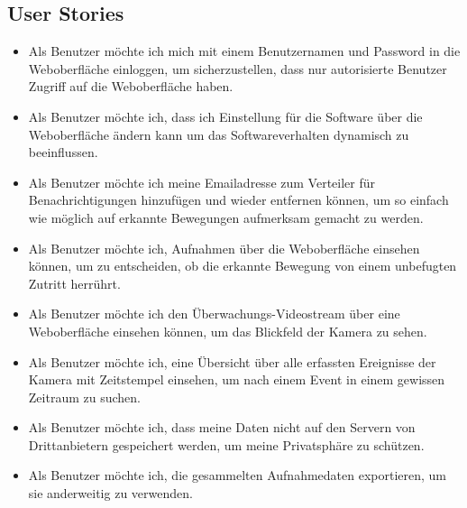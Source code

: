 \subsection{User Stories}
\begin{itemize}
\item
Als Benutzer möchte ich mich mit einem Benutzernamen und Password in die Weboberfläche einloggen, um sicherzustellen, dass nur autorisierte Benutzer Zugriff auf die Weboberfläche haben.
\item
Als Benutzer möchte ich, dass ich Einstellung für die Software über die Weboberfläche ändern kann um das Softwareverhalten dynamisch zu beeinflussen.
\item
Als Benutzer möchte ich meine Emailadresse zum Verteiler für Benachrichtigungen hinzufügen und wieder entfernen können, um so einfach wie möglich auf erkannte Bewegungen aufmerksam gemacht zu werden.
\item
Als Benutzer möchte ich, Aufnahmen über die Weboberfläche einsehen können, um zu entscheiden, ob die erkannte Bewegung von einem unbefugten Zutritt herrührt.
\item
Als Benutzer möchte ich den Überwachungs-Videostream über eine Weboberfläche einsehen können, um das Blickfeld der Kamera zu sehen.
\item
Als Benutzer möchte ich, eine Übersicht über alle erfassten Ereignisse der Kamera mit Zeitstempel einsehen, um nach einem Event in einem gewissen Zeitraum zu suchen.
\item
Als Benutzer möchte ich, dass meine Daten nicht auf den Servern von Drittanbietern gespeichert werden, um meine Privatsphäre zu schützen.
\item
Als Benutzer möchte ich, die gesammelten Aufnahmedaten exportieren, um sie anderweitig zu verwenden.
\end{itemize}

